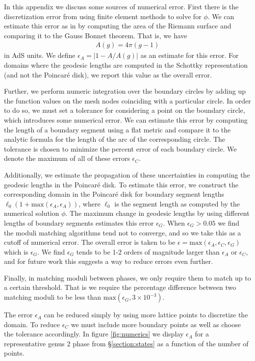 \documentclass[letterpaper,12pt]{article}
\newcommand{\ban}[1]{\begin{align}#1\end{align}}
\begin{document}
In this appendix we discuss some sources of numerical error. First there is the discretization error from using finite element methods to solve for $\phi$. We can estimate this error as in \cite{MRW} by computing the area of the Riemann surface and comparing it to the Gauss Bonnet theorem. That is, we have
\ban{
A(g) = 4 \pi (g-1) 	
}
in AdS units. We define $\epsilon_A = |1-A/A(g)|$ as an estimate for this error. For domains where the geodesic lengths are computed in the Schottky representation (and not the Poincar\'e disk), we report this value as the overall error.

Further, we perform numeric integration over the boundary circles by adding up the function values on the mesh nodes coinciding with a particular circle. In order to do so, we must set a tolerance for considering a point on the boundary circle, which introduces some numerical error. We can estimate this error by computing the length of a boundary segment using a flat metric and compare it to the analytic formula for the length of the arc of the corresponding circle. The tolerance is chosen to minimize the percent error of each boundary circle. We denote the maximum of all of these errors $\epsilon_C$.

Additionally, we estimate the propagation of these uncertainties in computing the geodesic lengths in the  Poincar\'e disk. To estimate this error, we construct the corresponding domain in the Poincar\'e disk for boundary segment lengths $\ell_0 (1 + \text{max}(\epsilon_A,\epsilon_A))$, where $\ell_0$ is the segment length as computed by the numerical solution $\phi$. The maximum change in geodesic lengths by using different lengths of boundary segments estimates this error $\epsilon_G$. When $\epsilon_G> 0.05$ we find the moduli matching algorithms tend not to converge, and so we take this as a cutoff of numerical error. The overall error is taken to be $\epsilon = \text{max}(\epsilon_A, \epsilon_C, \epsilon_G)$ which is $\epsilon_G$. We find $\epsilon_G$ tends to be 1-2 orders of magnitude larger than $\epsilon_A$ or $\epsilon_C$, and for future work this suggests a way to reduce errors even further. 	

Finally, in matching moduli between phases, we only require them to match up to a certain threshold. That is we require the percentage difference between two matching moduli to be less than $\text{max}(\epsilon_G, 3 \times 10^{-3})$.

The error $\epsilon_A$ can be reduced simply by using more lattice points to discretize the domain. To reduce $\epsilon_C$ we must include more boundary points as well as choose the tolerance accordingly. In figure \ref{fig:numerics} we display $\epsilon_A$ for a representative genus 2 phase from \S\ref{section:states} as a function of the number of points.
\end{document}
